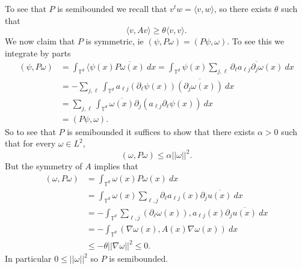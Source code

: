 \documentclass[10pt]{article}
\newcommand{\Torus}{\mathbb T}
\theoremstyle{definition}
\begin{document}
To see that $P$ is semibounded we recall that $v^tw = \langle v, w\rangle$, so there exists $\theta$ such that
$$\langle v, Av\rangle \geq \theta \langle v, v\rangle.$$
We now claim that $P$ is symmetric, ie $(\psi, P\omega) = (P\psi, \omega)$. To see this we integrate by parts
\begin{align*}
(\psi, P\omega) &= \int_{\Torus^d} \langle\psi(x) \overline{P\omega(x)} ~dx = \int_{\Torus^d} \psi(x) \sum_{j,\ell} \overline{\partial_\ell a_{\ell j} \partial_j \omega(x)} ~dx \\
&= -\sum_{j, \ell} \int_{\Torus^d} a_{\ell j} (\partial_\ell \psi(x)) \overline{(\partial_j \omega(x))} ~dx \\
&= \sum_{j, \ell} \int_{\Torus^d} \overline{\omega(x)} \partial_j (a_{\ell j} \partial_\ell \psi(x)) ~dx \\
&= (P \psi, \omega).
\end{align*}
So to see that $P$ is semibounded it suffices to show that there exists $\alpha > 0$ such that for every $\omega \in L^2$,
$$(\omega, P\omega) \leq \alpha ||\omega||^2.$$
But the symmetry of $A$ implies that
\begin{align*}
(\omega, P\omega) &= \int_{\Torus^d} \omega(x) P\omega(x) ~dx\\
&= \int_{\Torus^d} \omega(x) \sum_{\ell, j}\partial_\ell a_{\ell j}(x) \partial_j \overline{u(x)} ~dx\\
&= -\int_{\Torus^d} \sum_{\ell, j} (\partial_\ell \omega(x)), a_{\ell j}(x) \partial_j \overline{u(x)} ~dx \\
&= -\int_{\Torus^d} (\nabla \omega(x), A(x) \nabla \omega(x)) ~dx \\
&\leq -\theta ||\nabla \omega||^2 \leq 0.
\end{align*}
In particular $0 \leq ||\omega||^2$ so $P$ is semibounded.
\end{document}
